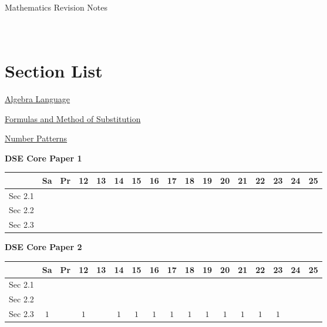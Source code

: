 \documentclass[12pt, a4paper]{article}
\begin{document}
\newpage
\newpage
\thispagestyle{empty}
\begin{center}
Mathematics Revision Notes\\\vspace{1cm}
\\\vspace{1cm}
{\fontsize{24pt}{24pt}\selectfont {Introduction to Algebra}} \\\vspace{1cm}
\label{chapter:S1-2}

\end{center}
\vspace{0.5cm}
\hline
\section*{Section List}
\begin{enumx}[label=Sec 2.\arabic*\ ]
\item \hyperref[section:1-2-1]{Algebra Language}
\item \hyperref[section:1-2-2]{Formulas and Method of Substitution}
\item \hyperref[section:1-2-3]{Number Patterns}
\end{enumx}
\begin{absolutelynopagebreak}
\begin{center}
\textbf{DSE Core Paper 1}
\end{center}
\begin{center}
\begin{tabular}{|l|c|c|c|c|c|c|c|c|c|c|c|c|c|c|c|c|}
\hline
        & Sa & Pr & 12 & 13 & 14 & 15 & 16 & 17 & 18 & 19 & 20 & 21 & 22 & 23 & 24 & 25 \\\hline\hline
Sec 2.1 &  &  &  &  &  &  &  &  &  &  &  &  &  &  &  &  \\\hline
Sec 2.2 &  &  &  &  &  &  &  &  &  &  &  &  &  &  &  &  \\\hline
Sec 2.3 &  &  &  &  &  &  &  &  &  &  &  &  &  &  &  &  \\\hline
\end{tabular}
\end{center}
\end{absolutelynopagebreak}
\begin{absolutelynopagebreak}
\begin{center}
\textbf{DSE Core Paper 2}
\end{center}
\begin{center}
\begin{tabular}{|l|c|c|c|c|c|c|c|c|c|c|c|c|c|c|c|c|}
\hline
        & Sa & Pr & 12 & 13 & 14 & 15 & 16 & 17 & 18 & 19 & 20 & 21 & 22 & 23 & 24 & 25 \\\hline\hline
Sec 2.1 &  &  &  &  &  &  &  &  &  &  &  &  &  &  &  &  \\\hline
Sec 2.2 &  &  &  &  &  &  &  &  &  &  &  &  &  &  &  &  \\\hline
Sec 2.3 &  $1$ &  &  $1$ &  &  $1$ &  $1$ &  $1$ &  $1$ &  $1$ &  $1$ &  $1$ &  $1$ &  $1$ &  $1$ &  &  \\\hline
\end{tabular}
\end{center}
\end{absolutelynopagebreak}
\end{document}
